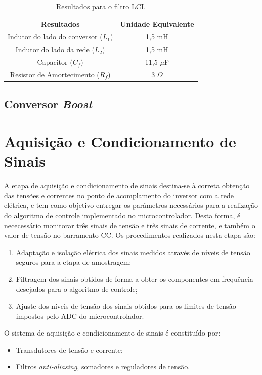 \begin{table}[h]
	\centering
	\caption{Resultados para o filtro LCL}
	\label{tab:resultados-filtro-lcl}
	
	\begin{tabular}{cc}
		\toprule
		\textbf{Resultados} & \textbf{Unidade Equivalente} \\
		\midrule
		Indutor do lado do conversor ($L_1$) & 1,5 mH \\
		Indutor do lado da rede ($L_2$) & 1,5 mH \\
		Capacitor ($C_f$) & 11,5 $\mu$F \\
		Resistor de Amortecimento ($R_f$) & 3 $\Omega$ \\
		\bottomrule
	\end{tabular}
\end{table}

\subsection{Conversor \textit{Boost}}

\section{Aquisição e Condicionamento de Sinais}

A etapa de aquisição e condicionamento de sinais destina-se à correta obtenção das tensões e correntes no ponto de acomplamento do inversor com a rede elétrica, e tem como objetivo entregar os parâmetros necessários para a realização do algoritmo de controle implementado no microcontrolador.
Desta forma, é nececessário monitorar três sinais de tensão e três sinais de corrente, e também o valor de tensão no barramento CC.
Os procedimentos realizados nesta etapa são:
\begin{enumerate}
	\item Adaptação e isolação elétrica dos sinais medidos através de níveis de tensão seguros para a etapa de amostragem;
	\item Filtragem dos sinais obtidos de forma a obter os componentes em frequência desejados para o algoritmo de controle;
	\item Ajuste dos níveis de tensão dos sinais obtidos para os limites de tensão impostos pelo ADC do microcontrolador.
\end{enumerate}

O sistema de aquisição e condicionamento de sinais é constituído por:

\begin{itemize}
	\item Transdutores de tensão e corrente;
	\item Filtros \textit{anti-aliasing}, somadores e reguladores de tensão.
\end{itemize}

